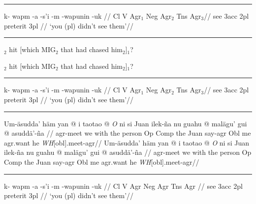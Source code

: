 \documentclass[12pt]{article}
\begin{document}
\filbreak\hrule\medskip

\begingroup
\ex
\begingl
\gla \rightcomment{[Potawatami]}k- wapm -a -s'i -m -wapunin -uk //
\glb {}Cl V Agr$_1$ Neg Agr$_2$ Tns Agr$_3$//
 see {\sc 3acc} {} {\sc 2pl} preterit {\sc 3pl} //
\glft `you (pl) didn't see them'//
\endgl
\xe
\endgroup
\bigskip

\filbreak\hrule\medskip

\begingroup
\pex
\a{}$_2$ hit [which
MIG$_2$ that had chased him$_2$]$_1$?

\a{}$_2$ hit [which MIG$_2$ that had
chased him$_2$]$_1$?
\xe
\endgroup
\bigskip

\filbreak\hrule\medskip

\begingroup
\hsize=3.5in
\ex
\rightcomment{[Potawatami]}
\begingl
\gla k- wapm -a -s'i -m -wapunin -uk //
\glb {}Cl V Agr$_1$ Neg Agr$_2$ Tns Agr$_3$//
 see {\sc 3acc} {} {\sc 2pl} preterit {\sc 3pl} //
\glft `you (pl) didn't see them'//
\endgl
\xe
\endgroup
\bigskip

\filbreak\hrule\medskip

\begingroup
\pex[extraglskip=2pt]
\a \begingl
\gla Um-\"asudda' h\"am yan \nogloss{$[\,$} @ i taotao \nogloss{$[\,$} @ {\it O\/}
ni si Juan ilek-\~na nu guahu \nogloss{$[\,$} @ mal\"agu' gui
\nogloss{$[\,$} @
asudd\"a'-\~na \nogloss{{\it t\/}$\,]]]]$.}//
\glb agr-meet we with the person Op Comp the Juan say-agr Obl me
agr.want he {\it WH\/}[obl].meet-agr//
\endgl
\a \begingl[extraglskip=!.5ex]
\gla Um-\"asudda' h\"am yan \nogloss{$[\,$} @ i taotao \nogloss{$[\,$} @ {\it O\/}
ni si Juan ilek-\~na nu guahu \nogloss{$[\,$} @ mal\"agu' gui
\nogloss{$[\,$} @
asudd\"a'-\~na \nogloss{{\it t\/}$\,]]]]$.}//
\glb agr-meet we with the person Op Comp the Juan say-agr Obl me
agr.want he {\it WH\/}[obl].meet-agr//
\endgl
\xe
\endgroup
\bigskip

\filbreak\hrule\medskip

\begingroup
{}

\ex
\begingl
\gla k- wapm -a -s'i -m -wapunin -uk //
\glcat Cl V Agr Neg Agr Tns Agr //
 see {3\sc acc} {} {2\sc pl} preterit {3\sc pl} //
\glft `you (pl) didn't see them'//
\endgl
\xe
\endgroup
\bigskip
\end{document}

